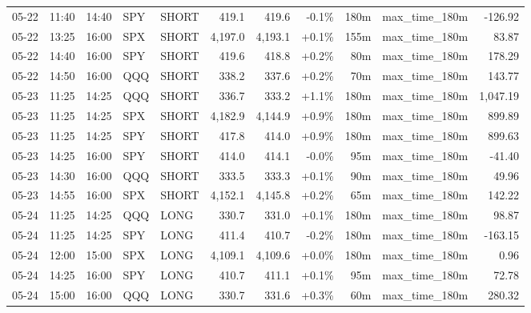 \documentclass[11pt,a4paper,twoside]{article}
\begin{document}
\begin{center}
\begin{longtable}{>{\color{txtmain}}l l l l l r r r r >{\color{txtmain}}l r}
05-22 & 11:40 & 14:40 & SPY & SHORT & 419.1 & 419.6 & \textcolor{lossred}{-0.1\%} & 180m & max\_time\_180m & \textcolor{lossred}{-126.92} \\
05-22 & 13:25 & 16:00 & SPX & SHORT & 4,197.0 & 4,193.1 & \textcolor{wingreen}{+0.1\%} & 155m & max\_time\_180m & \textcolor{wingreen}{83.87} \\
05-22 & 14:40 & 16:00 & SPY & SHORT & 419.6 & 418.8 & \textcolor{wingreen}{+0.2\%} & 80m & max\_time\_180m & \textcolor{wingreen}{178.29} \\
05-22 & 14:50 & 16:00 & QQQ & SHORT & 338.2 & 337.6 & \textcolor{wingreen}{+0.2\%} & 70m & max\_time\_180m & \textcolor{wingreen}{143.77} \\
05-23 & 11:25 & 14:25 & QQQ & SHORT & 336.7 & 333.2 & \textcolor{wingreen}{+1.1\%} & 180m & max\_time\_180m & \textcolor{wingreen}{1,047.19} \\
05-23 & 11:25 & 14:25 & SPX & SHORT & 4,182.9 & 4,144.9 & \textcolor{wingreen}{+0.9\%} & 180m & max\_time\_180m & \textcolor{wingreen}{899.89} \\
05-23 & 11:25 & 14:25 & SPY & SHORT & 417.8 & 414.0 & \textcolor{wingreen}{+0.9\%} & 180m & max\_time\_180m & \textcolor{wingreen}{899.63} \\
05-23 & 14:25 & 16:00 & SPY & SHORT & 414.0 & 414.1 & \textcolor{lossred}{-0.0\%} & 95m & max\_time\_180m & \textcolor{lossred}{-41.40} \\
05-23 & 14:30 & 16:00 & QQQ & SHORT & 333.5 & 333.3 & \textcolor{wingreen}{+0.1\%} & 90m & max\_time\_180m & \textcolor{wingreen}{49.96} \\
05-23 & 14:55 & 16:00 & SPX & SHORT & 4,152.1 & 4,145.8 & \textcolor{wingreen}{+0.2\%} & 65m & max\_time\_180m & \textcolor{wingreen}{142.22} \\
05-24 & 11:25 & 14:25 & QQQ & LONG & 330.7 & 331.0 & \textcolor{wingreen}{+0.1\%} & 180m & max\_time\_180m & \textcolor{wingreen}{98.87} \\
05-24 & 11:25 & 14:25 & SPY & LONG & 411.4 & 410.7 & \textcolor{lossred}{-0.2\%} & 180m & max\_time\_180m & \textcolor{lossred}{-163.15} \\
05-24 & 12:00 & 15:00 & SPX & LONG & 4,109.1 & 4,109.6 & \textcolor{wingreen}{+0.0\%} & 180m & max\_time\_180m & \textcolor{wingreen}{0.96} \\
05-24 & 14:25 & 16:00 & SPY & LONG & 410.7 & 411.1 & \textcolor{wingreen}{+0.1\%} & 95m & max\_time\_180m & \textcolor{wingreen}{72.78} \\
05-24 & 15:00 & 16:00 & QQQ & LONG & 330.7 & 331.6 & \textcolor{wingreen}{+0.3\%} & 60m & max\_time\_180m & \textcolor{wingreen}{280.32} \\

\end{longtable}
\end{center}
\end{document}
